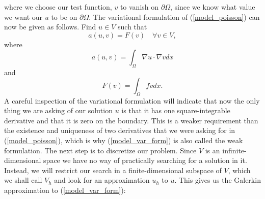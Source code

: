 \documentclass[12pt,a4paper]{article}
\theoremstyle{definition}
\begin{document}
where we choose our test function, $v$ to vanish on $\partial \Omega$, since we know what value we want our $u$ to be on $\partial \Omega$.  The variational formulation of (\ref{model_poisson}) can now be given as follows.  Find $u\in V$ such that
\begin{equation}\label{model_var_form}
a\left(u,v\right)=F\left(v\right) \quad \forall v \in V,
\end{equation}
where 
\begin{equation}
a\left(u,v\right) = \int_{\Omega}\nabla u \cdot \nabla v dx 
\end{equation} 
and
\begin{equation}
F\left(v\right) = \int_{\Omega}fvdx.
\end{equation}
A careful inspection of the variational formulation will indicate that now the only thing we are asking of our solution $u$ is that it has one square-integrable derivative and that it is zero on the boundary.  This is a weaker requirement than the existence and uniqueness of two derivatives that we were asking for in (\ref{model_poisson}), which is why (\ref{model_var_form}) is also called the weak formulation.  The next step is to discretize our problem.  Since $V$ is an infinite-dimensional space we have no way of practically searching for a solution in it.   Instead, we will restrict our search in a finite-dimensional subspace of $V$, which we shall call $V_h$ and look for an approximation $u_h$ to $u$.  This gives us the Galerkin approximation to (\ref{model_var_form}):
\end{document}
